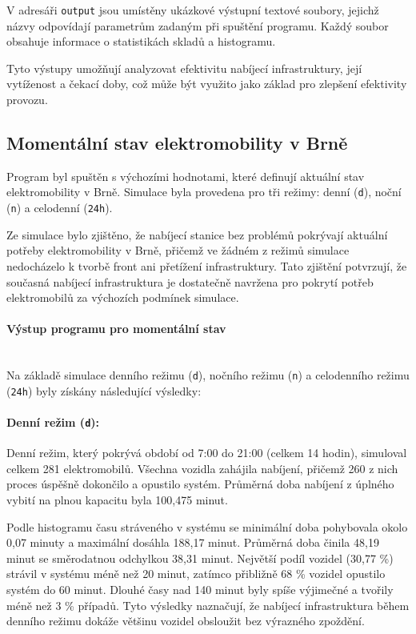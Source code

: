 \documentclass[a4paper,11pt]{article}
\begin{document}
V adresáři \texttt{output} jsou umístěny ukázkové výstupní textové soubory, jejichž názvy odpovídají parametrům zadaným při spuštění programu. Každý soubor obsahuje informace o statistikách skladů a histogramu.

Tyto výstupy umožňují analyzovat efektivitu nabíjecí infrastruktury, její vytíženost a čekací doby, což může být využito jako základ pro zlepšení efektivity provozu.

\subsection{Momentální stav elektromobility v Brně}
Program byl spuštěn s výchozími hodnotami, které definují aktuální stav elektromobility v Brně. Simulace byla provedena pro tři režimy: denní (\texttt{d}), noční (\texttt{n}) a celodenní (\texttt{24h}). 

Ze simulace bylo zjištěno, že nabíjecí stanice bez problémů pokrývají aktuální potřeby elektromobility v Brně, přičemž ve žádném z režimů simulace nedocházelo k tvorbě front ani přetížení infrastruktury. Tato zjištění potvrzují, že současná nabíjecí infrastruktura je dostatečně navržena pro pokrytí potřeb elektromobilů za výchozích podmínek simulace.

\paragraph{Výstup programu pro momentální stav\\\\}

Na základě simulace denního režimu (\texttt{d}), nočního režimu (\texttt{n}) a celodenního režimu (\texttt{24h}) byly získány následující výsledky:

\paragraph{Denní režim (\texttt{d}):} 
Denní režim, který pokrývá období od 7:00 do 21:00 (celkem 14 hodin), simuloval celkem 281 elektromobilů. Všechna vozidla zahájila nabíjení, přičemž 260 z nich proces úspěšně dokončilo a opustilo systém. Průměrná doba nabíjení z úplného vybití na plnou kapacitu byla 100,475 minut.

Podle histogramu času stráveného v systému se minimální doba pohybovala okolo 0,07 minuty a maximální dosáhla 188,17 minut. Průměrná doba činila 48,19 minut se směrodatnou odchylkou 38,31 minut. Největší podíl vozidel (30,77 \%) strávil v systému méně než 20 minut, zatímco přibližně 68 \% vozidel opustilo systém do 60 minut. Dlouhé časy nad 140 minut byly spíše výjimečné a tvořily méně než 3 \% případů. Tyto výsledky naznačují, že nabíjecí infrastruktura během denního režimu dokáže většinu vozidel obsloužit bez výrazného zpoždění.
\end{document}
